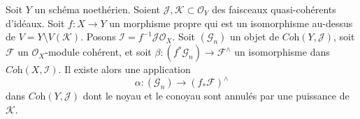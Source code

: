\begin{lemma}
\label{lemma-inverse-systems-push-pull}
Soit $Y$ un schéma noethérien. Soient
$\mathcal{J}, \mathcal{K} \subset \mathcal{O}_Y$
des faisceaux quasi-cohérents d'idéaux.
Soit $f : X \to Y$ un morphisme propre qui est un isomorphisme
au-dessus de $V = Y \setminus V(\mathcal{K})$.
Posons $\mathcal{I} = f^{-1}\mathcal{J} \mathcal{O}_X$.
Soit $(\mathcal{G}_n)$ un objet de $\textit{Coh}(Y, \mathcal{J})$,
soit $\mathcal{F}$ un $\mathcal{O}_X$-module cohérent, et soit
$\beta : (f^*\mathcal{G}_n)  \to \mathcal{F}^\wedge$ un isomorphisme dans
$\textit{Coh}(X, \mathcal{I})$. Il existe alors une application
$$
\alpha :
(\mathcal{G}_n)
\longrightarrow
(f_*\mathcal{F})^\wedge
$$
dans $\textit{Coh}(Y, \mathcal{J})$ dont le noyau et le conoyau
sont annulés par une puissance de $\mathcal{K}$.
\end{lemma}

